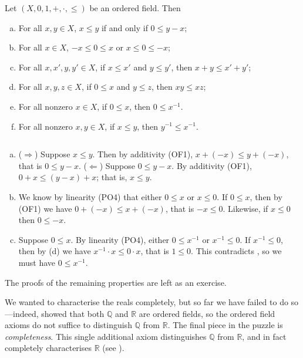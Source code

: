\begin{theorem}
\label{thmPropertiesOfOrderedFields}
Let $(X,0,1,+,{\cdot},{\le})$ be an ordered field. Then
\begin{enumerate}[(a)]
\item For all $x,y \in X$, $x \le y$ if and only if $0 \le y-x$;
\item For all $x \in X$, $-x \le 0 \le x$ or $x \le 0 \le -x$;
\item For all $x,x',y,y' \in X$, if $x \le x'$ and $y \le y'$, then $x + y \le x' + y'$;
\item For all $x,y,z \in X$, if $0 \le x$ and $y \le z$, then $xy \le xz$;
\item For all nonzero $x \in X$, if $0 \le x$, then $0 \le x^{-1}$.
\item For all nonzero $x,y \in X$, if $x \le y$, then $y^{-1} \le x^{-1}$.
\end{enumerate}
\end{theorem}
\begin{cproof}[of {(a)}, {(b)} and {(e)}]
$ $
\begin{enumerate}[(a)] 
\item ($\Rightarrow$) Suppose $x \le y$. Then by additivity (OF1), $x+(-x) \le y+(-x)$, that is $0 \le y-x$. ($\Leftarrow$) Suppose $0 \le y-x$. By additivity (OF1), $0+x \le (y-x)+x$; that is, $x \le y$.
\item We know by linearity (PO4) that either $0 \le x$ or $x \le 0$. If $0 \le x$, then by (OF1) we have $0+(-x) \le x+(-x)$, that is $-x \le 0$. Likewise, if $x \le 0$ then $0 \le -x$.
\setcounter{enumi}{4}
\item Suppose $0 \le x$. By linearity (PO4), either $0 \le x^{-1}$ or $x^{-1} \le 0$. If $x^{-1} \le 0$, then by (d) we have $x^{-1} \cdot x \le 0 \cdot x$, that is $1 \le 0$. This contradicts , so we must have $0 \le x^{-1}$.
\end{enumerate}
The proofs of the remaining properties are left as an exercise.
\end{cproof}

We wanted to characterise the reals completely, but so far we have failed to do so---indeed,  showed that both $\mathbb{Q}$ and $\mathbb{R}$ are ordered fields, so the ordered field axioms do not suffice to distinguish $\mathbb{Q}$ from $\mathbb{R}$. The final piece in the puzzle is \textit{completeness}. This single additional axiom distinguishes $\mathbb{Q}$ from $\mathbb{R}$, and in fact completely characterises $\mathbb{R}$ (see ).

